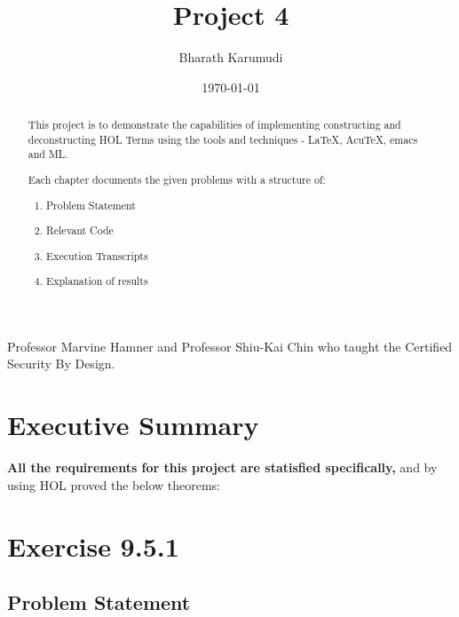 \documentclass{report}
\title{Project 4}
\author{Bharath Karumudi}
\date{\today}
\begin{document}
 \lstset{language=ML}
 \maketitle{}

 \begin{abstract}
   This project is to demonstrate the capabilities of implementing
   constructing and deconstructing HOL Terms using the tools and
   techniques - \LaTeX{}, AcuTeX, emacs and ML. 

   Each chapter documents the given problems with a structure of:
   \begin{enumerate}
   \item Problem Statement
   \item Relevant Code
   \item Execution Transcripts
   \item Explanation of results
   \end{enumerate}

 \end{abstract}


 \begin{acknowledgments}
  Professor Marvine Hamner and Professor Shiu-Kai Chin who taught the
  Certified Security By Design.
 \end{acknowledgments}

 \tableofcontents{}

 \chapter{Executive Summary}
 \label{cha:executive-summary}

\textbf{All the requirements for this project are statisfied specifically,}
 and by using HOL proved the below theorems:
\begin{quote}
\HOLexerciseNineTheorems
\HOLexerciseOneZeroTheorems
\end{quote}



 \chapter{Exercise 9.5.1}
 \label{cha:exercise-9.5.1}
  
 \section{Problem Statement}
 \label{sec:problem-statement-1}
\end{document}
